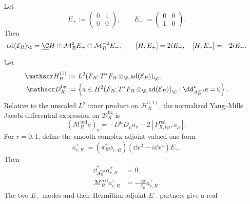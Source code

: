 Let
\begin{equation}\label{eq:s6cusp-root-matrices}
 E_+:=\begin{pmatrix}0&1\\0&0\end{pmatrix},
 \qquad
 E_-:=\begin{pmatrix}0&0\\1&0\end{pmatrix}.
\end{equation}
Then
\begin{equation}\label{eq:s6cusp-adjoint-root-splitting}
 \operatorname{ad}(\mathcal E_R)_{\C}
 =\underline\C H\oplus\mathcal M_R^2E_+
 \oplus\mathcal M_R^{-2}E_-,
 \qquad
 [H,E_+]=2iE_+,
 \quad [H,E_-]=-2iE_-.
\end{equation}

\begin{theorem}
\label{thm:s6cusp-reducible-negative-mode}
Let
\begin{align}
 \mathscr H_R^{(1)}
 &:={L^2\!\left(F_R;
 T^*F_R\otimes_{\R}\operatorname{ad}(\mathcal E_R)\right)}_{\C},
 \label{eq:s6cusp-background-hilbert-space}\\
 \mathscr D_R^{\mathrm{bg}}
 &:=\left\{a\in
 {H^2\!\left(F_R;
 T^*F_R\otimes_{\R}\operatorname{ad}(\mathcal E_R)\right)}_{\C}:
 \dd_{A_R^{\mathrm{red}}}^*a=0\right\}.
 \label{eq:s6cusp-background-sobolev-domain}
\end{align}
Relative to the unscaled \(L^2\) inner product on
\(\mathscr H_R^{(1)}\), the normalized Yang--Mills Jacobi differential
expression on \(\mathscr D_R^{\mathrm{bg}}\) is
\begin{equation}\label{eq:s6cusp-background-jacobi-operator}
 (\mathcal M_R^{\mathrm{red}}a)_\nu
 =-D^\mu D_\mu a_\nu
 -2[F^{\mathrm{red}}_{R,\nu\mu},a_\mu].
\end{equation}
For \(r=0,1\), define the smooth complex adjoint-valued one-form
\begin{equation}\label{eq:s6cusp-explicit-negative-root-mode}
 a_{r,R}^+
 :=(\pi_R^*\phi_{r,R})
 (\dd x^2-i\dd x^4)E_+.
\end{equation}
Then
\begin{align}
 \dd_{A_R^{\mathrm{red}}}^*a_{r,R}^+&=0,
 \label{eq:s6cusp-negative-mode-background-gauge}\\
 \mathcal M_R^{\mathrm{red}}a_{r,R}^+
 &=-\frac{4\pi}{\delta_R}a_{r,R}^+.
 \label{eq:s6cusp-negative-mode-eigenvalue}
\end{align}
The two \(E_+\) modes and their Hermitian-adjoint \(E_-\) partners give a real

\end{theorem}
